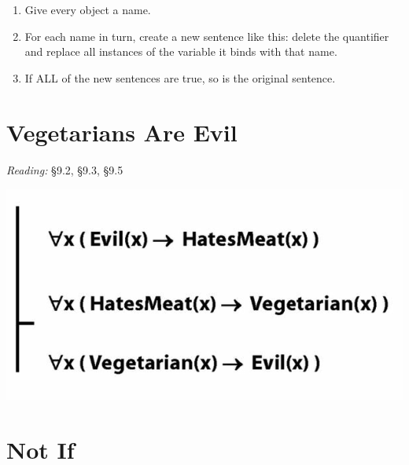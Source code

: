 \documentclass[12pt]{extarticle}
\begin{document}
\begin{multicols*}{3}
\begin{enumerate}
 
\item Give every object a name.
 
\item For each name in turn, create a new sentence like this: delete the quantifier and replace all instances of the variable it binds with that name.
 
\item If ALL of the new sentences are true, so is the original sentence.
 
\end{enumerate}
 
 
 
\section{Vegetarians Are Evil}
 
\emph{Reading:} §9.2, §9.3, §9.5
 
\begin{center}
\includegraphics[scale=0.3]{img/vegetarians.png}
\end{center}
 
 
\section{Not If}
 

\end{multicols*}
\end{document}
